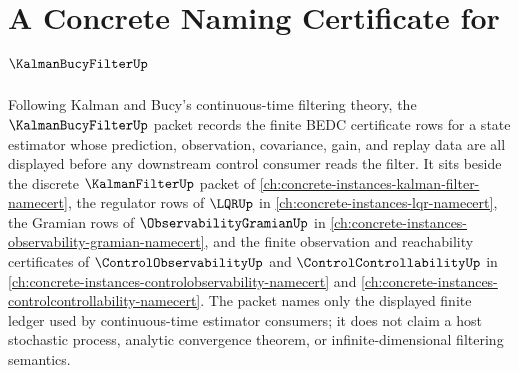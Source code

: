 \chapter{A Concrete Naming Certificate for $\KalmanBucyFilterUp$}
\label{ch:concrete-instances-kalman-bucy-filter-namecert}

Following Kalman and Bucy's continuous-time filtering theory, the $\KalmanBucyFilterUp$ packet records the finite BEDC certificate rows for a state estimator whose prediction, observation, covariance, gain, and replay data are all displayed before any downstream control consumer reads the filter. It sits beside the discrete $\KalmanFilterUp$ packet of \autoref{ch:concrete-instances-kalman-filter-namecert}, the regulator rows of $\LQRUp$ in \autoref{ch:concrete-instances-lqr-namecert}, the Gramian rows of $\ObservabilityGramianUp$ in \autoref{ch:concrete-instances-observability-gramian-namecert}, and the finite observation and reachability certificates of $\ControlObservabilityUp$ and $\ControlControllabilityUp$ in \autoref{ch:concrete-instances-controlobservability-namecert} and \autoref{ch:concrete-instances-controlcontrollability-namecert}. The packet names only the displayed finite ledger used by continuous-time estimator consumers; it does not claim a host stochastic process, analytic convergence theorem, or infinite-dimensional filtering semantics.

